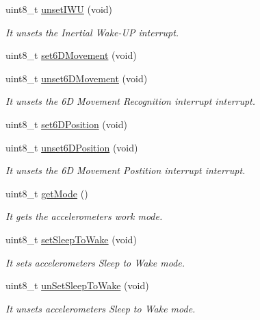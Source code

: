 \begin{DoxyCompactItemize}
\item 
uint8\+\_\+t \hyperlink{class_wasp_a_c_c_aeff5903b57a7fbd83cdd8389bdfbd3f6}{unset\+I\+WU} (void)
\begin{DoxyCompactList}\small\item\em It unsets the Inertial Wake-\/\+UP interrupt. \end{DoxyCompactList}\item 
uint8\+\_\+t \hyperlink{class_wasp_a_c_c_af397a30eacee4432daf2bc3506e4b915}{set6\+D\+Movement} (void)
\item 
uint8\+\_\+t \hyperlink{class_wasp_a_c_c_a36d9b73fc127ad3789da3cd6aae6b1b4}{unset6\+D\+Movement} (void)
\begin{DoxyCompactList}\small\item\em It unsets the 6D Movement Recognition interrupt interrupt. \end{DoxyCompactList}\item 
uint8\+\_\+t \hyperlink{class_wasp_a_c_c_acb6a205493ee39ca1cd5205c9d64ffbe}{set6\+D\+Position} (void)
\item 
uint8\+\_\+t \hyperlink{class_wasp_a_c_c_acaee2292b7a8fce48a922e44cf7e0398}{unset6\+D\+Position} (void)
\begin{DoxyCompactList}\small\item\em It unsets the 6D Movement Postition interrupt interrupt. \end{DoxyCompactList}\item 
uint8\+\_\+t \hyperlink{class_wasp_a_c_c_ac230de590102dcfe1c4f20afde66e1ae}{get\+Mode} ()
\begin{DoxyCompactList}\small\item\em It gets the accelerometer\textquotesingle{}s work mode. \end{DoxyCompactList}\item 
uint8\+\_\+t \hyperlink{class_wasp_a_c_c_a268f14bdff8be64d161beb7342732fd0}{set\+Sleep\+To\+Wake} (void)
\begin{DoxyCompactList}\small\item\em It sets accelerometer\textquotesingle{}s Sleep to Wake mode. \end{DoxyCompactList}\item 
uint8\+\_\+t \hyperlink{class_wasp_a_c_c_a7044f89874bf615c2da0c43b5162764f}{un\+Set\+Sleep\+To\+Wake} (void)
\begin{DoxyCompactList}\small\item\em It unsets accelerometer\textquotesingle{}s Sleep to Wake mode. \end{DoxyCompactList}\item 

\end{DoxyCompactItemize}
